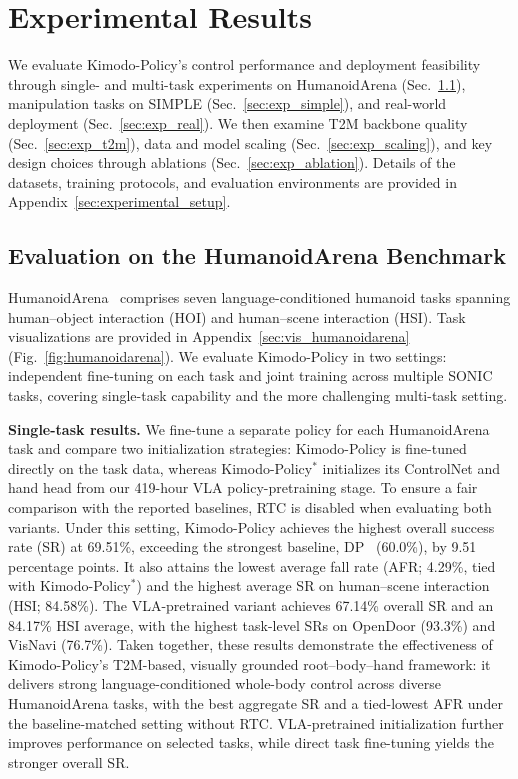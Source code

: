 \section{Experimental Results}
\label{sec:experiments}

We evaluate Kimodo-Policy's control performance and deployment feasibility through single- and multi-task experiments on HumanoidArena (Sec.~\ref{sec:exp_simulation}), manipulation tasks on SIMPLE (Sec.~\ref{sec:exp_simple}), and real-world deployment (Sec.~\ref{sec:exp_real}). We then examine T2M backbone quality (Sec.~\ref{sec:exp_t2m}), data and model scaling (Sec.~\ref{sec:exp_scaling}), and key design choices through ablations (Sec.~\ref{sec:exp_ablation}). Details of the datasets, training protocols, and evaluation environments are provided in Appendix~\ref{sec:experimental_setup}.

\subsection{Evaluation on the HumanoidArena Benchmark}
\label{sec:exp_simulation}

HumanoidArena~\cite{humanoidarena} comprises seven language-conditioned humanoid tasks spanning human--object interaction (HOI) and human--scene interaction (HSI). Task visualizations are provided in Appendix~\ref{sec:vis_humanoidarena} (Fig.~\ref{fig:humanoidarena}). We evaluate Kimodo-Policy in two settings: independent fine-tuning on each task and joint training across multiple SONIC tasks, covering single-task capability and the more challenging multi-task setting.



\textbf{Single-task results.} We fine-tune a separate policy for each HumanoidArena task and compare two initialization strategies: Kimodo-Policy is fine-tuned directly on the task data, whereas Kimodo-Policy$^{*}$ initializes its ControlNet and hand head from our 419-hour VLA policy-pretraining stage. To ensure a fair comparison with the reported baselines, RTC is disabled when evaluating both variants. Under this setting, Kimodo-Policy achieves the highest overall success rate (SR) at 69.51\%, exceeding the strongest baseline, DP~\cite{chi2023diffusionpolicy} (60.0\%), by 9.51 percentage points. It also attains the lowest average fall rate (AFR; 4.29\%, tied with Kimodo-Policy$^{*}$) and the highest average SR on human--scene interaction (HSI; 84.58\%). The VLA-pretrained variant achieves 67.14\% overall SR and an 84.17\% HSI average, with the highest task-level SRs on OpenDoor (93.3\%) and VisNavi (76.7\%). Taken together, these results demonstrate the effectiveness of Kimodo-Policy's T2M-based, visually grounded root--body--hand framework: it delivers strong language-conditioned whole-body control across diverse HumanoidArena tasks, with the best aggregate SR and a tied-lowest AFR under the baseline-matched setting without RTC. VLA-pretrained initialization further improves performance on selected tasks, while direct task fine-tuning yields the stronger overall SR.

